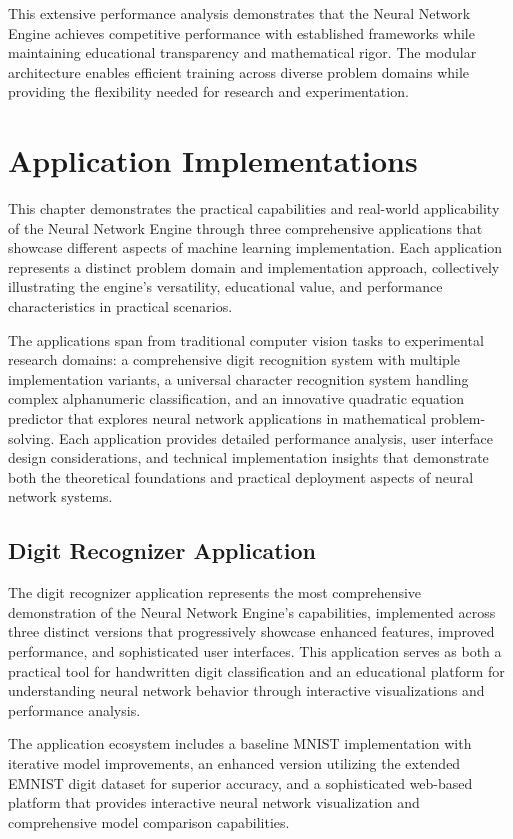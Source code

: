 \documentclass[11pt,a4paper]{report}
\begin{document}
This extensive performance analysis demonstrates that the Neural Network Engine achieves competitive performance with established frameworks while maintaining educational transparency and mathematical rigor. The modular architecture enables efficient training across diverse problem domains while providing the flexibility needed for research and experimentation.

\chapter{Application Implementations}

This chapter demonstrates the practical capabilities and real-world applicability of the Neural Network Engine through three comprehensive applications that showcase different aspects of machine learning implementation. Each application represents a distinct problem domain and implementation approach, collectively illustrating the engine's versatility, educational value, and performance characteristics in practical scenarios.

The applications span from traditional computer vision tasks to experimental research domains: a comprehensive digit recognition system with multiple implementation variants, a universal character recognition system handling complex alphanumeric classification, and an innovative quadratic equation predictor that explores neural network applications in mathematical problem-solving. Each application provides detailed performance analysis, user interface design considerations, and technical implementation insights that demonstrate both the theoretical foundations and practical deployment aspects of neural network systems.

\section{Digit Recognizer Application}

The digit recognizer application represents the most comprehensive demonstration of the Neural Network Engine's capabilities, implemented across three distinct versions that progressively showcase enhanced features, improved performance, and sophisticated user interfaces. This application serves as both a practical tool for handwritten digit classification and an educational platform for understanding neural network behavior through interactive visualizations and performance analysis.

The application ecosystem includes a baseline MNIST implementation with iterative model improvements, an enhanced version utilizing the extended EMNIST digit dataset for superior accuracy, and a sophisticated web-based platform that provides interactive neural network visualization and comprehensive model comparison capabilities.
\end{document}
